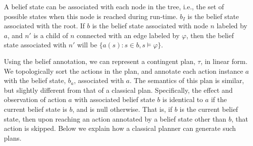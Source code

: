 \documentclass[letterpaper]{article}
\numberwithin{equation}{section}	%
\begin{document}
A belief state can be associated with each node in the tree, i.e., the set of possible states when this node is reached
during run-time. $b_I$ is the belief state associated with the root.
If $b$ is the belief state associated with node $n$ labeled by $a$,
and $n'$ is a child of $n$ connected with an edge labeled by $\varphi$, then the belief state associated with $n'$
will be $\{a(s) : s\in b, s\models\varphi\}$.

Using the belief annotation, we can represent a contingent plan, $\tau$,
in linear form. We topologically sort the actions in the plan, and annotate each action instance
$a$ with the belief state, $b_a$, associated with $a$. The semantics of this plan is similar, but slightly different
from that of a classical plan. Specifically, the effect and observation of action $a$ with associated belief state $b$ is identical to $a$ if
the current belief state is $b$, and is null otherwise. That is, if $b$ is the current belief state, then upon reaching an action annotated by a belief state other than $b$, that action is skipped.
Below we explain how a classical planner can generate such plans.

\end{document}
